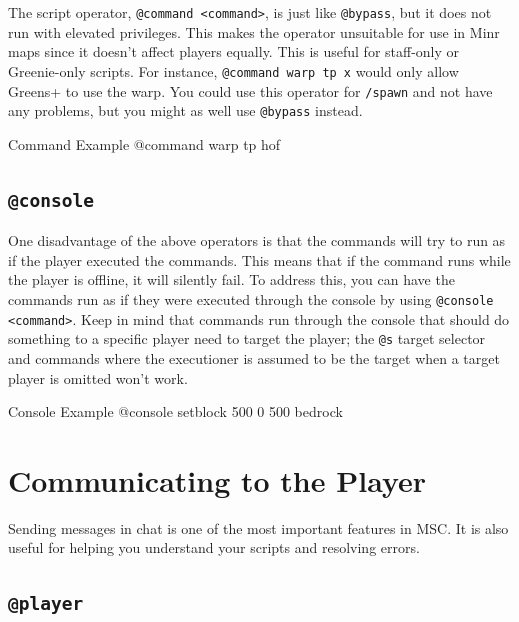 \documentclass[oneside]{book}
\begin{document}
The script operator, \texttt{@command <command>}, is just like \texttt{@bypass}, but it does not run with elevated privileges. This makes the operator unsuitable for use in Minr maps since it doesn't affect players equally. This is useful for staff-only or Greenie-only scripts. For instance, \texttt{@command warp tp x} would only allow Greens+ to use the warp. You could use this operator for \texttt{/spawn} and not have any problems, but you might as well use \texttt{@bypass} instead.

\begin{msccode}{Command Example}
@command warp tp hof
\end{msccode}

\subsection{\texttt{@console}}

One disadvantage of the above operators is that the commands will try to run as if the player executed the commands. This means that if the command runs while the player is offline, it will silently fail. To address this, you can have the commands run as if they were executed through the console by using \texttt{@console <command>}. Keep in mind that commands run through the console that should do something to a specific player need to target the player; the \texttt{@s} target selector and commands where the executioner is assumed to be the target when a target player is omitted won't work.

\begin{msccode}{Console Example}
@console setblock 500 0 500 bedrock
\end{msccode}

\section{Communicating to the Player}

Sending messages in chat is one of the most important features in MSC. It is also useful for helping you understand your scripts and resolving errors.

\subsection{\texttt{@player}}
\end{document}
